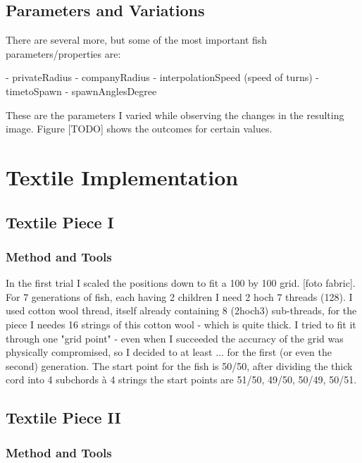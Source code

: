 \documentclass{scrartcl}
\begin{document}
\subsection{Parameters and Variations} %
There are several more, but some of the most important fish parameters/properties are:

- privateRadius
- companyRadius
- interpolationSpeed (speed of turns)
- timetoSpawn
- spawnAnglesDegree

These are the parameters I varied while observing the changes in the resulting image.
Figure [TODO] shows the outcomes for certain values.


\section{Textile Implementation}

\subsection{Textile Piece I}
\subsubsection{Method and Tools}


In the first trial I scaled the positions down to fit a 100 by 100 grid. [foto fabric].
For 7 generations of fish, each having 2 children I need 2 hoch 7 threads (128). I used cotton wool thread, itself already containing 8 (2hoch3) sub-threads, for the piece I needes 16 strings of this cotton wool - which is quite thick. I tried to fit it through one "grid point" - even when I succeeded the accuracy of the grid was physically compromised, so I decided to at least ... for the first (or even the second) generation. The start point for the fish is 50/50, after dividing the thick cord into 4 subchords à 4 strings the start points are 51/50, 49/50, 50/49, 50/51.


\subsection{Textile Piece II}
\subsubsection{Method and Tools}

\section{}
\end{document}
